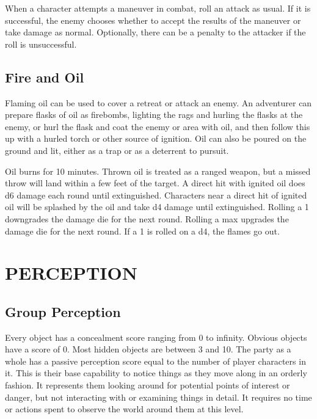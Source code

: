 \documentclass[twoside]{article}
\begin{document}
When a character attempts a maneuver in combat, roll an attack as usual. If it is successful, the enemy chooses whether to accept the results of the maneuver or take damage as normal. Optionally, there can be a penalty to the attacker if the roll is unsuccessful.

\subsection*{Fire and Oil}

Flaming oil can be used to cover a retreat or attack an enemy. An adventurer can prepare flasks of oil as firebombs, lighting the rags and hurling the flasks at the enemy, or hurl the flask and coat the enemy or area with oil, and then follow this up with a hurled torch or other source of ignition. Oil can also be poured on the ground and lit, either as a trap or as a deterrent to pursuit. 

\bigbreak

Oil burns for 10 minutes. Thrown oil is treated as a ranged weapon, but a missed throw will land within a few feet of the target. A direct hit with ignited oil does d6 damage each round until extinguished. Characters near a direct hit of ignited oil will be splashed by the oil and take d4 damage until extinguished. Rolling a 1 downgrades the damage die for the next round. Rolling a max upgrades the damage die for the next round. If a 1 is rolled on a d4, the flames go out.

\section*{PERCEPTION}

\subsection*{Group Perception}

Every object has a concealment score ranging from 0 to infinity. Obvious objects have a score of 0. Most hidden objects are between 3 and 10. The party as a whole has a passive perception score equal to the number of player characters in it. This is their base capability to notice things as they move along in an orderly fashion. It represents them looking around for potential points of interest or danger, but not interacting with or examining things in detail. It requires no time or actions spent to observe the world around them at this level.
\end{document}

